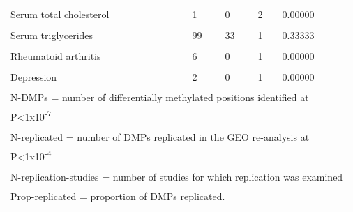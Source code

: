 \documentclass[11pt,oneside]{bristolthesis}
\begin{document}
\begin{table}
{\begin{tabular}[t]{lllll}
Serum total cholesterol & 1 & 0 & 2 & 0.00000\\
\cellcolor{gray!6}{Serum triglycerides} & \cellcolor{gray!6}{46} & \cellcolor{gray!6}{38} & \cellcolor{gray!6}{1} & \cellcolor{gray!6}{0.82609}\\
Serum triglycerides & 99 & 33 & 1 & 0.33333\\
\cellcolor{gray!6}{Rheumatoid arthritis} & \cellcolor{gray!6}{47,875} & \cellcolor{gray!6}{8} & \cellcolor{gray!6}{1} & \cellcolor{gray!6}{0.00017}\\
\addlinespace
Rheumatoid arthritis & 6 & 0 & 1 & 0.00000\\
\cellcolor{gray!6}{Depression} & \cellcolor{gray!6}{1} & \cellcolor{gray!6}{0} & \cellcolor{gray!6}{1} & \cellcolor{gray!6}{0.00000}\\
Depression & 2 & 0 & 1 & 0.00000\\
\bottomrule
\multicolumn{5}{l}{\textsuperscript{} N-DMPs = number of differentially methylated positions identified at}\\
\multicolumn{5}{l}{P<1x10\textsuperscript{-7}}\\
\multicolumn{5}{l}{\textsuperscript{} N-replicated = number of DMPs replicated in the GEO re-analysis at}\\
\multicolumn{5}{l}{P<1x10\textsuperscript{-4}}\\
\multicolumn{5}{l}{\textsuperscript{} N-replication-studies = number of studies for which replication was examined}\\
\multicolumn{5}{l}{\textsuperscript{} Prop-replicated = proportion of DMPs replicated.}\\
\end{tabular}}
\end{table}
\end{document}
